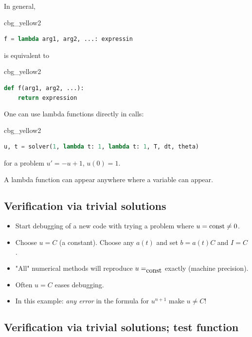 \documentclass[%
oneside,                 %
final,                   %
10pt]{article}
\newenvironment{_cod_tight}[1]{
   \def\FrameCommand{\colorbox{#1}}
   \FrameRule0.6pt\MakeFramed {\FrameRestore}\vskip3mm}
   {\vskip0mm\endMakeFramed}
\newenvironment{cod}[1]{
\bgroup\rmfamily
\fboxsep=0mm\relax
\begin{_cod_tight}{#1}
\list{}{\parsep=-2mm\parskip=0mm\topsep=0pt\leftmargin=2mm
\rightmargin=2\leftmargin\leftmargin=4pt\relax}
\item\relax}
{\endlist\end{_cod_tight}\egroup}
\begin{document}
In general,
\begin{cod}{cbg_yellow2}\begin{lstlisting}[language=Python,style=simple,xleftmargin=2mm]
f = lambda arg1, arg2, ...: expressin
\end{lstlisting}\end{cod}
\noindent
is equivalent to
\begin{cod}{cbg_yellow2}\begin{lstlisting}[language=Python,style=simple,xleftmargin=2mm]
def f(arg1, arg2, ...):
    return expression
\end{lstlisting}\end{cod}
\noindent

One can use lambda functions directly in calls:
\begin{cod}{cbg_yellow2}\begin{lstlisting}[language=Python,style=simple,xleftmargin=2mm]
u, t = solver(1, lambda t: 1, lambda t: 1, T, dt, theta)
\end{lstlisting}\end{cod}
\noindent
for a problem $u'=-u+1$, $u(0)=1$.

A lambda function can appear anywhere where a variable can appear.

\subsection*{Verification via trivial solutions}
\label{decay:verify:trivial}

\begin{itemize}
 \item Start debugging of a new code with trying a problem
   where $u=\hbox{const} \neq 0$.

 \item Choose $u=C$ (a constant). Choose any $a(t)$ and set
   $b=a(t)C$ and
   $I=C$.

 \item "All" numerical methods will reproduce $u=_{\hbox{const}}$
   exactly (machine precision).

 \item Often $u=C$ eases debugging.

 \item In this example: \emph{any error} in the formula for $u^{n+1}$
   make $u\neq C$!
\end{itemize}

\noindent
\subsection*{Verification via trivial solutions; test function}
\end{document}
